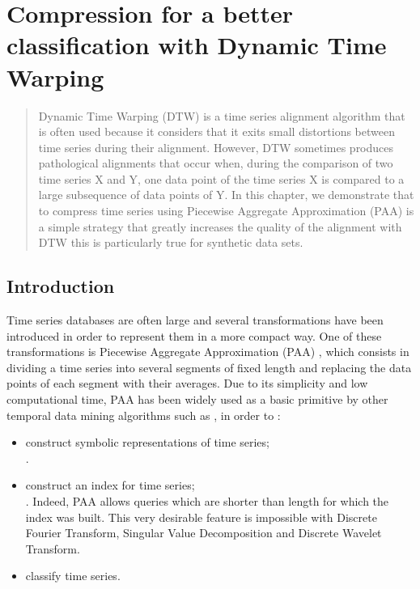 \chapter[Preprocessing of time series]{Compression for a better classification with Dynamic Time Warping}
\label{fdtw}

\begin{abstract}
 Dynamic Time Warping (DTW) is a time series alignment algorithm that is often used because it
 considers that it exits small distortions between time series during their alignment.  However, DTW
 sometimes produces pathological alignments that occur when, during the comparison of two time series
 X and Y, one data point of the time series X is compared to a large subsequence of data points of Y.
 In this chapter, we demonstrate that to compress time series using Piecewise Aggregate Approximation
 (PAA) is a simple strategy that greatly increases the quality of the alignment with DTW this is
 particularly true for synthetic data sets.      
 \end{abstract}

\section{Introduction}
%


Time series databases are often large and several transformations have been
introduced in order to represent them in a more compact way. One of these transformations is
Piecewise Aggregate Approximation (PAA) \cite{keogh2001dimensionality}, which consists in dividing a
time series into several segments of fixed length and replacing the data points of each segment with
their averages. Due to its simplicity and low computational time, PAA has been widely used as a
basic primitive by other temporal data mining algorithms such as \cite{lin2003symbolic} \cite{sun2014improvement}  \cite{lkhagva2006extended}, in order to : 
\begin{itemize}
  \item construct symbolic representations of time
series; \cite{camerra2010isax} \\ \cite{ulanova2015scalable}.
  \item construct an index for time series; \cite{zhao2016shapedtw} \\ \cite{keogh2000scaling}  \cite{Kate2016}. Indeed, PAA allows queries which are shorter than length for which the
index was built. This very desirable feature is impossible with Discrete Fourier Transform, Singular
Value Decomposition and Discrete Wavelet Transform.
\item classify time series.
\end{itemize}


